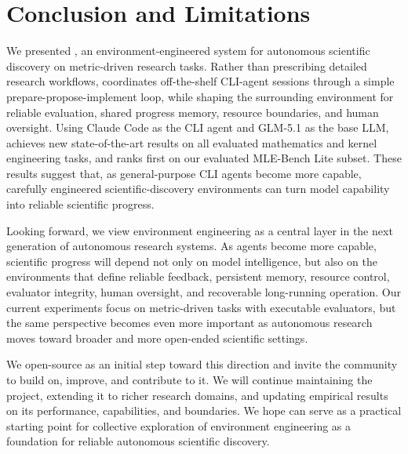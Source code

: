 \documentclass{article} %
\begin{document}
   \section{Conclusion and Limitations}
   
   
   
   We presented \method, an environment-engineered system for autonomous scientific discovery on metric-driven research tasks. Rather than prescribing detailed research
     workflows, \method coordinates off-the-shelf CLI-agent sessions through a simple prepare-propose-implement loop, while shaping the surrounding environment for reliable
     evaluation, shared progress memory, resource boundaries, and human oversight.
     Using Claude Code as the CLI agent and GLM-5.1 as the base LLM, \method achieves new state-of-the-art results on all evaluated mathematics and kernel engineering tasks, and
     ranks first on our evaluated MLE-Bench Lite subset. These results suggest that, as general-purpose CLI agents become more capable, carefully engineered scientific-discovery
     environments can turn model capability into reliable scientific progress.
   
   Looking forward, we view environment engineering as a central layer in the next generation of autonomous research systems.
   As agents become more capable, scientific progress will depend not only on model intelligence, but also on the environments that define reliable feedback, persistent memory, resource control, evaluator integrity, human oversight, and recoverable long-running operation.
   Our current experiments focus on metric-driven tasks with executable evaluators, but the same perspective becomes even more important as autonomous research moves toward broader and more open-ended scientific settings.
   
   We open-source \method as an initial step toward this direction and invite the community to build on, improve, and contribute to it.
   We will continue maintaining the project, extending it to richer research domains, and updating empirical results on its performance, capabilities, and boundaries.
   We hope \method can serve as a practical starting point for collective exploration of environment engineering as a foundation for reliable autonomous scientific discovery.
\end{document}
